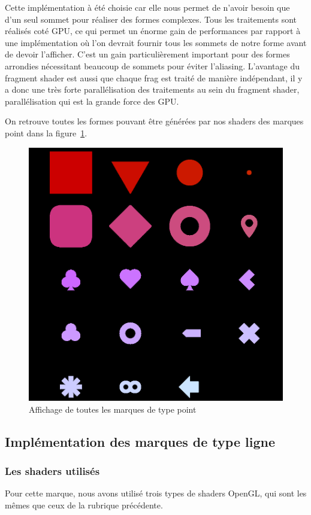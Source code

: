 \documentclass[12pt]{article}
\begin{document}
Cette implémentation à été choisie car elle nous permet de n'avoir besoin que d'un seul sommet pour réaliser des formes complexes.
Tous les traitements sont réalisés coté GPU, ce qui permet un énorme gain de performances par rapport à une implémentation où
l'on devrait fournir tous les sommets de notre forme avant de devoir l'afficher. C'est un gain particulièrement important pour
des formes arrondies nécessitant beaucoup de sommets pour éviter l'aliasing.
L'avantage du fragment shader est aussi que chaque \gls{frag} est traité de manière indépendant, il y a donc une très forte
parallélisation des traitements au sein du fragment shader, parallélisation qui est la grande force des GPU.

On retrouve toutes les formes pouvant être générées par nos shaders des marques point dans la figure~\ref{fig:point-marks}.
\begin{figure}[htp]
  \centering
  \includegraphics[scale=0.5]{images/point_mark}
  \caption{Affichage de toutes les marques de type point}
  \label{fig:point-marks}
\end{figure}

\subsection{Implémentation des marques de type ligne}
\subsubsection{Les shaders utilisés}
Pour cette marque, nous avons utilisé trois types de shaders OpenGL, qui sont les mêmes que ceux de la rubrique précédente.
\end{document}
